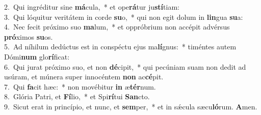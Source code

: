 {2.~}Qui ingréditur sine \textbf{má}cula,~* et ope\textbf{rá}tur ju\textbf{stí}tiam:\\
{3.~}Qui lóquitur veritátem in corde \textbf{su}o,~* qui non egit dolum in \textbf{lin}gua \textbf{su}a:\\
{4.~}Nec fecit próximo suo \textbf{ma}lum,~* et oppróbrium non accépit advérsus \textbf{pró}ximos \textbf{su}os.\\
{5.~}Ad níhilum dedúctus est in conspéctu ejus ma\textbf{lí}gnus:~* timéntes autem Dómi\textbf{num} glo\textbf{rí}ficat:\\
{6.~}Qui jurat próximo suo, et non \textbf{dé}cipit,~* qui pecúniam suam non dedit ad usúram, et múnera super innocéntem \textbf{non} ac\textbf{cé}pit.\\
{7.~}Qui \textbf{fa}cit hæc:~* non movébitur \textbf{in} æ\textbf{tér}num.\\
{8.~}Glória Patri, et \textbf{Fí}lio,~* et Spi\textbf{rí}tui \textbf{San}cto.\\
{9.~}Sicut erat in princípio, et nunc, et \textbf{sem}per,~* et in sǽcula sæcu\textbf{ló}rum. \textbf{A}men.\\
